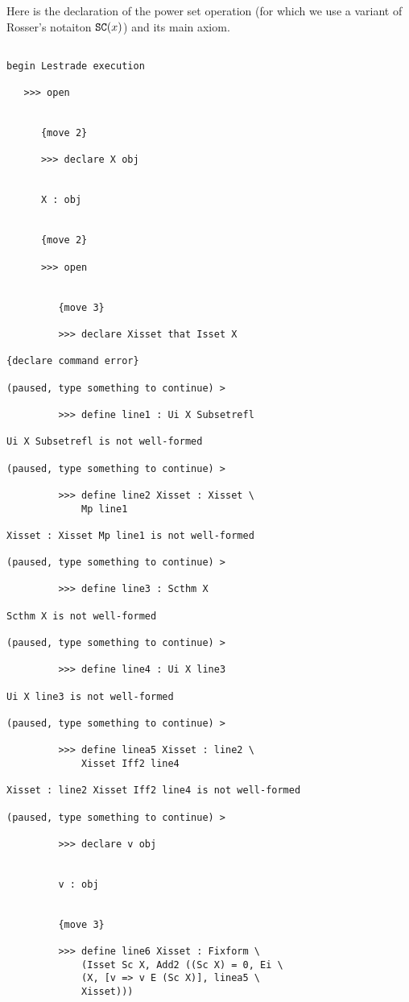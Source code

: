 \documentclass[12pt]{article}
\begin{document}
Here is the declaration of the power set operation (for which we use a variant of Rosser's notaiton ${\tt SC}(x)$) and its main axiom.

\begin{verbatim}

begin Lestrade execution

   >>> open


      {move 2}

      >>> declare X obj


      X : obj


      {move 2}

      >>> open


         {move 3}

         >>> declare Xisset that Isset X

{declare command error}

(paused, type something to continue) >

         >>> define line1 : Ui X Subsetrefl

Ui X Subsetrefl is not well-formed

(paused, type something to continue) >

         >>> define line2 Xisset : Xisset \
             Mp line1

Xisset : Xisset Mp line1 is not well-formed

(paused, type something to continue) >

         >>> define line3 : Scthm X

Scthm X is not well-formed

(paused, type something to continue) >

         >>> define line4 : Ui X line3

Ui X line3 is not well-formed

(paused, type something to continue) >

         >>> define linea5 Xisset : line2 \
             Xisset Iff2 line4

Xisset : line2 Xisset Iff2 line4 is not well-formed

(paused, type something to continue) >

         >>> declare v obj


         v : obj


         {move 3}

         >>> define line6 Xisset : Fixform \
             (Isset Sc X, Add2 ((Sc X) = 0, Ei \
             (X, [v => v E (Sc X)], linea5 \
             Xisset)))


\end{verbatim}
\end{document}
